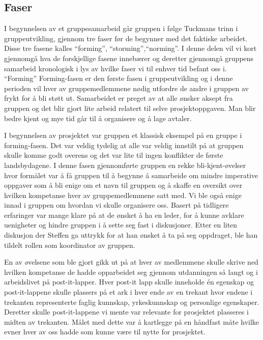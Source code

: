 \documentclass[a4paper,norsk,oneside]{article}
\begin{document}
\subsection{Faser}
I begynnelsen av et gruppesamarbeid går gruppen i følge Tuckmans trinn i gruppeutvikling, gjennom tre faser før de begynner med det faktiske arbeidet. Disse tre fasene kalles “forming”, “storming”,“norming”. I denne delen vil vi kort gjennomgå hva de forskjellige fasene innebærer og deretter gjennomgå gruppens samarbeid kronologisk i lys av hvilke faser vi til enhver tid befant oss i. \cite{bruce}
“Forming”
Forming-fasen er den første fasen i gruppeutvikling og i denne perioden vil hver av gruppemedlemmene nødig utfordre de andre i gruppen av frykt for å bli støtt ut. Samarbeidet er preget av at alle ønsker aksept fra gruppen og det blir gjort lite arbeid relatert til selve prosjektoppgaven. Man blir bedre kjent og mye tid går til å organisere og å lage avtaler.

I begynnelsen av prosjektet var gruppen et klassisk eksempel på en gruppe i forming-fasen. Det var veldig tydelig at alle var veldig innstilt på at gruppen skulle komme godt overens og det var lite til ingen konflikter de første landsbydagene. I denne fasen gjennomførte gruppen en rekke bli-kjent-øvelser hvor formålet var å få gruppen til å begynne å samarbeide om mindre imperative oppgaver som å bli enige om et navn til gruppen og å skaffe en oversikt over hvilken kompetanse hver av gruppemedlemmene satt med. Vi ble også enige innad i gruppen om hvordan vi skulle organisere oss. Basert på tidligere erfaringer var mange klare på at de ønsket å ha en leder, for å kunne avklare uenigheter og hindre gruppen i å sette seg fast i diskusjoner. Etter en liten diskusjon der Steffen ga uttrykk for at han ønsket å ta på seg oppdraget, ble han tildelt rollen som koordinator av gruppen.

En av øvelsene som ble gjort gikk ut på at hver av medlemmene skulle skrive ned hvilken kompetanse de hadde opparbeidet seg gjennom utdanningen så langt og i arbeidslivet på post-it-lapper. Hver post-it lapp skulle inneholde én egenskap og post-it-lappene skulle plassers på et ark i hver ende av en trekant hvor endene i trekanten representerte faglig kunnskap, yrkeskunnskap og personlige egenskaper. Deretter skulle post-it-lappene vi mente var relevante for prosjektet plasseres i midten av trekanten. Målet med dette var å kartlegge på en håndfast måte hvilke evner hver av oss hadde som kunne være til nytte for prosjektet.
\end{document}
